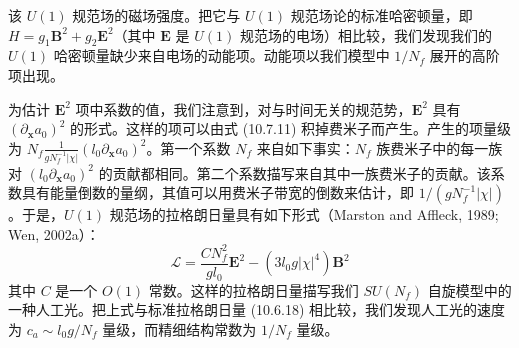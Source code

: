 该 $U(1)$ 规范场的磁场强度。把它与 $U(1)$ 规范场论的标准哈密顿量，即 $H=g_1\pmb B^{2}+g_2\pmb E^{2}$（其中 $\pmb E$ 是 $U(1)$ 规范场的电场）相比较，我们发现我们的 $U(1)$ 哈密顿量缺少来自电场的动能项。动能项以我们模型中 $1/N_f$ 展开的高阶项出现。

为估计 $\pmb E^{2}$ 项中系数的值，我们注意到，对与时间无关的规范势，$\pmb E^{2}$ 具有 $(\partial_{\pmb x}a_0)^{2}$ 的形式。这样的项可以由式 (10.7.11) 积掉费米子而产生。产生的项量级为 $N_f\frac{1}{gN_f^{-1}|\chi|}(l_0\partial_{\pmb x}a_0)^{2}$。第一个系数 $N_f$ 来自如下事实：$N_f$ 族费米子中的每一族对 $(l_0\partial_{\pmb x}a_0)^{2}$ 的贡献都相同。第二个系数描写来自其中一族费米子的贡献。该系数具有能量倒数的量纲，其值可以用费米子带宽的倒数来估计，即 $1/(gN_f^{-1}|\chi|)$。于是，$U(1)$ 规范场的拉格朗日量具有如下形式（Marston and Affleck, 1989; Wen, 2002a）：
\begin{equation*}
\mathcal L=\frac{CN_f^{2}}{gl_0}\pmb E^{2}-(3l_0g|\chi|^{4})\pmb B^{2}
\end{equation*}
其中 $C$ 是一个 $O(1)$ 常数。这样的拉格朗日量描写我们 $SU(N_f)$ 自旋模型中的一种人工光。把上式与标准拉格朗日量 (10.6.18) 相比较，我们发现人工光的速度为 $c_a\sim l_0g/N_f$ 量级，而精细结构常数为 $1/N_f$ 量级。

